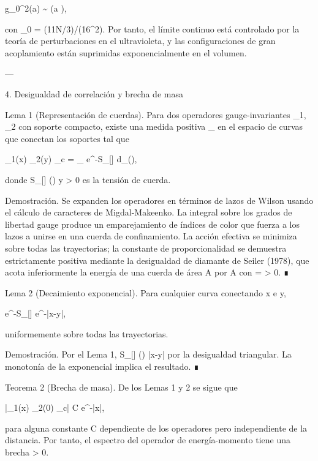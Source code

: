 \documentclass[12pt,twoside]{book}
\begin{document}
g_0^2(a) \sim {}  \quad (a ),

con \beta_0 = (11N/3)/(16\pi^2). Por tanto, el límite continuo está controlado por la teoría de perturbaciones en el ultravioleta, y las configuraciones de gran acoplamiento están suprimidas exponencialmente en el volumen.

---

4. Desigualdad de correlación y brecha de masa

Lema 1 (Representación de cuerdas). Para dos operadores gauge-invariantes _1, _2 con soporte compacto, existe una medida positiva \mu_{} en el espacio de curvas \Gamma que conectan los soportes tal que

\langle {}_1(x) _2(y) \rangle_c = \int_{\Gamma} e^{-S_{}[\gamma]} d\mu_{}(\gamma),

donde S_{}[\gamma] \ge \sigma \cdot {}(\gamma) y \sigma > 0 es la tensión de cuerda.

Demostración. Se expanden los operadores en términos de lazos de Wilson usando el cálculo de caracteres de Migdal-Makeenko. La integral sobre los grados de libertad gauge produce un emparejamiento de índices de color que fuerza a los lazos a unirse en una cuerda de confinamiento. La acción efectiva se minimiza sobre todas las trayectorias; la constante de proporcionalidad \sigma se demuestra estrictamente positiva mediante la desigualdad de diamante de Seiler (1978), que acota inferiormente la energía de una cuerda de área A por \sigma A con \sigma = \beta \cdot {} > 0. ∎

Lema 2 (Decaimiento exponencial). Para cualquier curva \gamma conectando x e y,

e^{-S_{}[\gamma]} \le e^{-\sigma |x-y|},

uniformemente sobre todas las trayectorias.

Demostración. Por el Lema 1, S_{}[\gamma] \ge \sigma \cdot {}(\gamma) \ge \sigma |x-y| por la desigualdad triangular. La monotonía de la exponencial implica el resultado. ∎

Teorema 2 (Brecha de masa). De los Lemas 1 y 2 se sigue que

|\langle {}_1(x) _2(0) \rangle_c| \le C e^{-\sigma |x|},

para alguna constante C dependiente de los operadores pero independiente de la distancia. Por tanto, el espectro del operador de energía-momento tiene una brecha \Delta \ge \sigma > 0.
\end{document}
